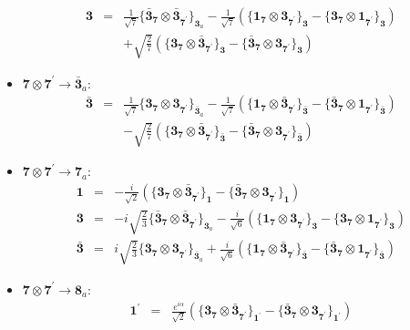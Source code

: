 \documentclass[english]{article}
\newcommand{\subcg}[3]{\big\{ {#1}\otimes{#2}\big\}^{}_{#3}}
\newcommand{\rep}[1]{\mathbf{#1}}
\begin{document}
\begin{itemize}
\begin{eqnarray*}
\rep{3} &=& \frac{1}{\sqrt{7}}\subcg{\rep{\bar{3}}_{\rep{7}}}{\rep{\bar{3}}_{\rep{7^{\prime}}}}{\rep{3}_{a}}-\frac{1}{\sqrt{7}}\left(\subcg{\rep{1}_{\rep{7}}}{\rep{3}_{\rep{7^{\prime}}}}{\rep{3}}-\subcg{\rep{3}_{\rep{7}}}{\rep{1}_{\rep{7^{\prime}}}}{\rep{3}}\right) \\ 
 & & +\sqrt{\frac{2}{7}}\left(\subcg{\rep{3}_{\rep{7}}}{\rep{\bar{3}}_{\rep{7^{\prime}}}}{\rep{3}}-\subcg{\rep{\bar{3}}_{\rep{7}}}{\rep{3}_{\rep{7^{\prime}}}}{\rep{3}}\right)
\end{eqnarray*}
\item $\rep{7}\otimes\rep{7^{\prime}}\to\rep{\bar{3}}_{a}$:
\begin{eqnarray*}
\rep{\bar{3}} &=& \frac{1}{\sqrt{7}}\subcg{\rep{3}_{\rep{7}}}{\rep{3}_{\rep{7^{\prime}}}}{\rep{\bar{3}}_{a}}-\frac{1}{\sqrt{7}}\left(\subcg{\rep{1}_{\rep{7}}}{\rep{\bar{3}}_{\rep{7^{\prime}}}}{\rep{\bar{3}}}-\subcg{\rep{\bar{3}}_{\rep{7}}}{\rep{1}_{\rep{7^{\prime}}}}{\rep{\bar{3}}}\right) \\ 
 & & -\sqrt{\frac{2}{7}}\left(\subcg{\rep{3}_{\rep{7}}}{\rep{\bar{3}}_{\rep{7^{\prime}}}}{\rep{\bar{3}}}-\subcg{\rep{\bar{3}}_{\rep{7}}}{\rep{3}_{\rep{7^{\prime}}}}{\rep{\bar{3}}}\right)
\end{eqnarray*}
\item $\rep{7}\otimes\rep{7^{\prime}}\to\rep{7}_{a}$:
\begin{eqnarray*}
\rep{1} &=& -\frac{i}{\sqrt{2}}\left(\subcg{\rep{3}_{\rep{7}}}{\rep{\bar{3}}_{\rep{7^{\prime}}}}{\rep{1}}-\subcg{\rep{\bar{3}}_{\rep{7}}}{\rep{3}_{\rep{7^{\prime}}}}{\rep{1}}\right)
\\
\rep{3} &=& -i \sqrt{\frac{2}{3}}\subcg{\rep{\bar{3}}_{\rep{7}}}{\rep{\bar{3}}_{\rep{7^{\prime}}}}{\rep{3}_{a}}-\frac{i}{\sqrt{6}}\left(\subcg{\rep{1}_{\rep{7}}}{\rep{3}_{\rep{7^{\prime}}}}{\rep{3}}-\subcg{\rep{3}_{\rep{7}}}{\rep{1}_{\rep{7^{\prime}}}}{\rep{3}}\right)
\\
\rep{\bar{3}} &=& i \sqrt{\frac{2}{3}}\subcg{\rep{3}_{\rep{7}}}{\rep{3}_{\rep{7^{\prime}}}}{\rep{\bar{3}}_{a}}+\frac{i}{\sqrt{6}}\left(\subcg{\rep{1}_{\rep{7}}}{\rep{\bar{3}}_{\rep{7^{\prime}}}}{\rep{\bar{3}}}-\subcg{\rep{\bar{3}}_{\rep{7}}}{\rep{1}_{\rep{7^{\prime}}}}{\rep{\bar{3}}}\right)
\end{eqnarray*}
\item $\rep{7}\otimes\rep{7^{\prime}}\to\rep{8}_{a}$:
\begin{eqnarray*}
\rep{1^{\prime}} &=& \frac{e^{i \alpha }}{\sqrt{2}}\left(\subcg{\rep{3}_{\rep{7}}}{\rep{\bar{3}}_{\rep{7^{\prime}}}}{\rep{1^{\prime}}}-\subcg{\rep{\bar{3}}_{\rep{7}}}{\rep{3}_{\rep{7^{\prime}}}}{\rep{1^{\prime}}}\right)

\end{eqnarray*}
\end{itemize}
\end{document}
